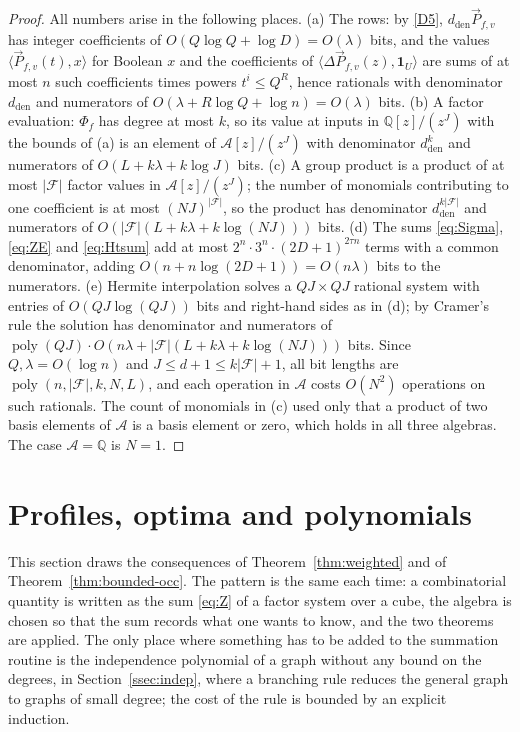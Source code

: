 \documentclass[11pt,reqno]{amsart}
\numberwithin{equation}{section}
\theoremstyle{plain}
\theoremstyle{definition}
\theoremstyle{remark}
\DeclareMathOperator{\poly}{poly}
\newcommand{\A}{\mathcal{A}}
\newcommand{\F}{\mathcal{F}}
\newcommand{\Q}{\mathbb{Q}}
\newcommand{\PP}{\vec{P}}
\newcommand{\ip}[2]{\langle #1,#2\rangle}
\begin{document}
\begin{proof}
All numbers arise in the following places. (a) The rows: by \ref{D5},
$d_{\mathrm{den}}\PP_{f,v}$ has integer coefficients of $O(Q\log Q+\log D)=O(\lambda)$
bits, and the values $\ip{\PP_{f,v}(t)}{x}$ for Boolean $x$ and the coefficients of
$\ip{\Delta\PP_{f,v}(z)}{\mathbf 1_U}$ are sums of at most $n$ such coefficients
times powers $t^{i}\le Q^{R}$, hence rationals with denominator
$d_{\mathrm{den}}$ and numerators of $O(\lambda+R\log Q+\log n)=O(\lambda)$ bits.
(b) A factor evaluation: $\Phi_f$ has degree at most $k$, so its value at inputs
in $\Q[z]/(z^J)$ with the bounds of (a) is an element of $\A[z]/(z^J)$ with
denominator $d_{\mathrm{den}}^{k}$ and numerators of $O(L+k\lambda+k\log J)$ bits.
(c) A group product is a product of at most $|\F|$ factor values in
$\A[z]/(z^J)$; the number of monomials contributing to one coefficient is at
most $(NJ)^{|\F|}$, so the product has denominator $d_{\mathrm{den}}^{k|\F|}$ and
numerators of $O(|\F|(L+k\lambda+k\log(NJ)))$ bits. (d) The sums
\eqref{eq:Sigma}, \eqref{eq:ZE} and \eqref{eq:Htsum} add at most
$2^{n}\cdot 3^{n}\cdot(2D+1)^{2\tau n}$ terms with a common denominator, adding
$O(n+n\log(2D+1))=O(n\lambda)$ bits to the numerators. (e) Hermite interpolation
solves a $QJ\times QJ$ rational system with entries of $O(QJ\log(QJ))$ bits and
right-hand sides as in (d); by Cramer's rule the solution has denominator and
numerators of $\poly(QJ)\cdot O(n\lambda+|\F|(L+k\lambda+k\log(NJ)))$ bits. Since
$Q,\lambda=O(\log n)$ and $J\le d+1\le k|\F|+1$, all bit lengths are
$\poly(n,|\F|,k,N,L)$, and each
operation in $\A$ costs $O(N^2)$ operations on such rationals. The count of
monomials in (c) used only that a product of two basis elements of $\A$ is a
basis element or zero, which holds in all three algebras.
The case $\A=\Q$ is $N=1$.
\end{proof}

\section{Profiles, optima and polynomials}\label{sec:applications}

This section draws the consequences of Theorem~\ref{thm:weighted} and of
Theorem~\ref{thm:bounded-occ}. The pattern is the same each time: a
combinatorial quantity is written as the sum \eqref{eq:Z} of a factor system
over a cube, the algebra is chosen so that the sum records what one wants to
know, and the two theorems are applied. The only place where something has to
be added to the summation routine is the independence polynomial of a graph
without any bound on the degrees, in Section~\ref{ssec:indep}, where a
branching rule reduces the general graph to graphs of small degree; the cost of
the rule is bounded by an explicit induction.
\end{document}
